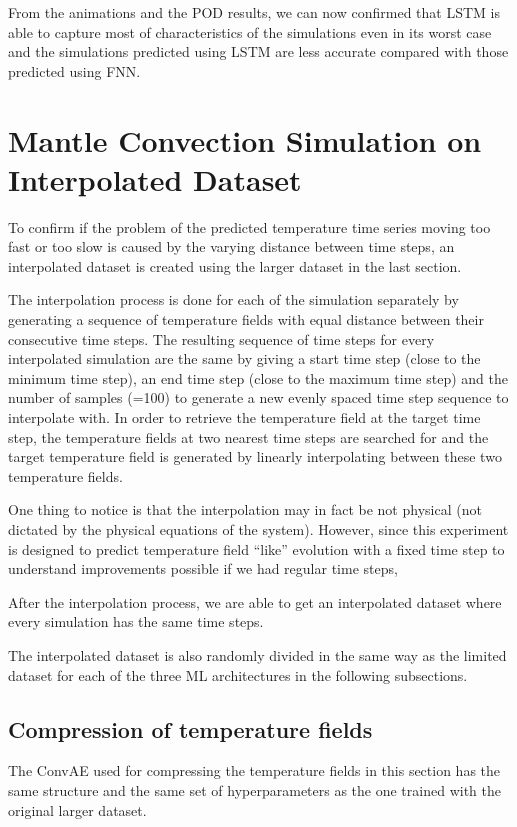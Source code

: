 From the animations and the POD results, we can now confirmed that LSTM is able to capture most of characteristics of the simulations even in its worst case and the simulations predicted using LSTM are less accurate compared with those predicted using FNN.


\section{Mantle Convection Simulation on Interpolated Dataset}

To confirm if the problem of the predicted temperature time series moving too fast or too slow is caused by the varying distance between time steps, an interpolated dataset is created using the larger dataset in the last section.

The interpolation process is done for each of the simulation separately by generating a sequence of temperature fields with equal distance between their consecutive time steps. The resulting sequence of time steps for every interpolated simulation are the same by giving a start time step (close to the minimum time step), an end time step (close to the maximum time step) and the number of samples (=100) to generate a new evenly spaced time step sequence to interpolate with. In order to retrieve the temperature field at the target time step, the temperature fields at two nearest time steps are searched for and the target temperature field is generated by linearly interpolating between these two temperature fields.

One thing to notice is that the interpolation may in fact be not physical (not dictated by the physical equations of the system). However, since this experiment is designed to predict temperature field ``like'' evolution with a fixed time step to understand improvements possible if we had regular time steps, 

After the interpolation process, we are able to get an interpolated dataset where every simulation has the same time steps.

The interpolated dataset is also randomly divided in the same way as the limited dataset for each of the three ML architectures in the following subsections.


\subsection{Compression of temperature fields}

The ConvAE used for compressing the temperature fields in this section has the same structure and the same set of hyperparameters as the one trained with the original larger dataset.

